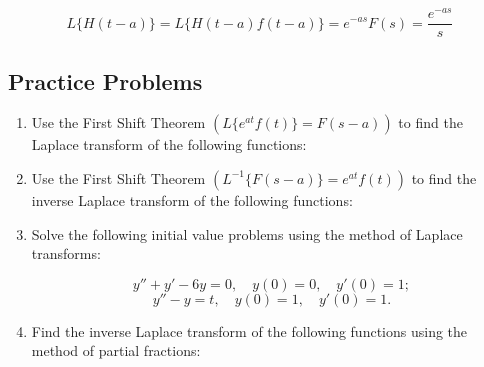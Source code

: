 \documentclass[a4paper, 10pt]{article}
\begin{document}
\begin{examplebox}
  $$L\{H(t-a)\} = L\{H(t-a)f(t-a)\} = e^{-as}F(s) = \dfrac{e^{-as}}{s}$$
\end{examplebox}


\subsection{Practice Problems}
\begin{enumerate}
  \item Use the First Shift Theorem \(\left( L \{ e^{at} f(t) \} = F(s - a) \right)\) to find the Laplace transform of the following functions:

  \item Use the First Shift Theorem \(\left( L^{-1} \{ F(s - a) \} = e^{at} f(t) \right)\) to find the inverse Laplace transform of the following functions:

  \item Solve the following initial value problems using the method of Laplace transforms:

        $$
          y'' + y' - 6y = 0 , \quad  y(0) = 0 , \quad  y'(0) = 1 ;
        $$
        $$
          y'' - y = t , \quad  y(0) = 1 , \quad  y'(0) = 1 .
        $$
  \item Find the inverse Laplace transform of the following functions using the method of partial fractions:

\end{enumerate}
\end{document}
